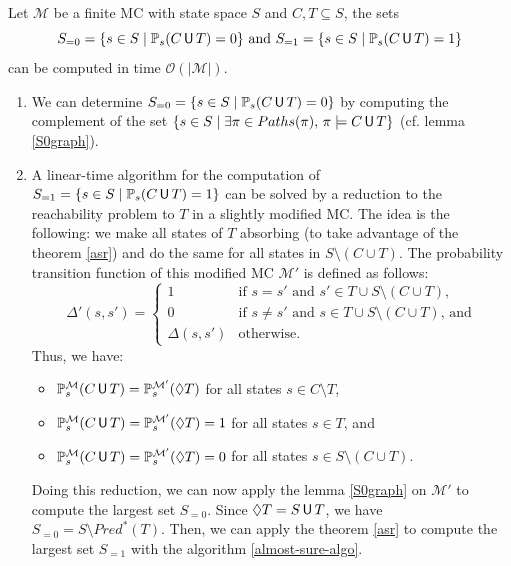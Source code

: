 \begin{corollary} Let $\mathcal{M}$ be a finite MC with state space $S$ and $C, T \subseteq S$, the sets
\[
  S_{=0} = \{ s \in S \; | \; \mathbb{P}_s (C \,\text{\sffamily U}\, T) = 0 \} \text{ and } S_{=1} = \{ s \in S \; | \; \mathbb{P}_s (C \,\text{\sffamily U}\, T ) = 1 \}
  \]
  can be computed in time $\mathcal{O}(|\mathcal{M}|)$.
\end{corollary}
\begin{proof2}\cite{PMC}
\begin{enumerate}
  \item We can determine $S_{=0}=\{s \in S \; | \; \mathbb{P}_s(C \,\text{\sffamily U}\, T)=0\}$ by computing the complement of the set $\{s \in S \; | \; \exists \pi \in Paths(\pi), \, \pi \models C \,\text{\sffamily U}\, T \}$ (cf. lemma \ref{S0graph}).
  \item A linear-time algorithm for the computation of $S_{=1}=\{ s\in S \; | \; \mathbb{P}_s(C \,\text{\sffamily U}\, T) = 1 \}$ can be solved by a reduction to the reachability problem to $T$ in a slightly modified MC. The idea is the following: we make all states of $T$ absorbing (to take advantage of the theorem \ref{asr}) and do the same for all states in $S \setminus (C \cup T)$.
  The probability transition function of this modified MC $\mathcal{M}'$ is
  defined as follows:
  \[
    \Delta'(s, s') = \begin{cases}
      1 & \text{if } s=s' \text{ and } s'\in T \cup S \setminus(C \cup T),\\
      0 & \text{if } s \neq s' \text{ and } s \in T \cup S \setminus (C \cup T),\, \text{and}\\
      \Delta(s, s') & \text{otherwise}.
    \end{cases}
  \]
  Thus, we have:
  \begin{itemize}
    \item $\mathbb{P}_s^\mathcal{M}(C \,\text{\sffamily U}\, T) = \mathbb{P}_s^\mathcal{M'}(\Diamond T)$ for all states $s \in C \setminus T$,
    \item $\mathbb{P}_s^\mathcal{M}(C \,\text{\sffamily U}\, T) = \mathbb{P}_s^{\mathcal{M}'}(\Diamond T) = 1$
    for all states $s \in T$, and
    \item $\mathbb{P}_s^\mathcal{M}(C \,\text{\sffamily U}\, T)= \mathbb{P}_s^{\mathcal{M}'}(\Diamond T) = 0$ for all states $s \in S \setminus (C \cup T)$.
  \end{itemize}
  Doing this reduction, we can now apply the lemma \ref{S0graph} on $\mathcal{M}'$ to compute the largest set $S_{=0}$. Since $\Diamond T = S \,\text{\sffamily U}\, T$, we have $S_{=0}= S \setminus Pred^*(T)$. Then, we can apply the theorem  \ref{asr} to compute the largest set $S_{=1}$ with the algorithm \ref{almost-sure-algo}.
\end{enumerate}
\end{proof2}\\

